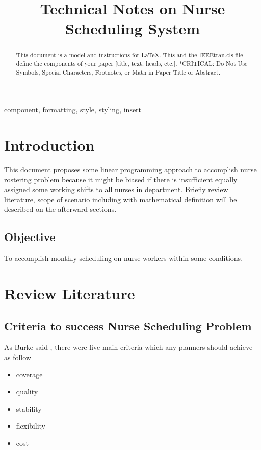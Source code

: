 \documentclass[conference]{IEEEtran}
\begin{document}
\title{Technical Notes on Nurse Scheduling System}

\author{
}

\maketitle

\begin{abstract}
This document is a model and instructions for \LaTeX.
This and the IEEEtran.cls file define the components of your paper [title, text, heads, etc.]. *CRITICAL: Do Not Use Symbols, Special Characters, Footnotes, 
or Math in Paper Title or Abstract.
\end{abstract}

\begin{IEEEkeywords}
component, formatting, style, styling, insert
\end{IEEEkeywords}

\section{Introduction}
This document proposes some linear programming approach to accomplish nurse rostering problem because it might be biased if there is insufficient equally assigned some working shifts to all nurses in department. Briefly review literature, scope of scenario including with mathematical definition will be described on the afterward sections.

\subsection{Objective}
To accomplish monthly scheduling on nurse workers within some conditions.

\section{Review Literature}

\subsection{Criteria to success Nurse Scheduling Problem}

As Burke said \cite{Burke2004}, there were five main criteria which any planners should achieve as follow
\begin{itemize}
	\item coverage
	\item quality
	\item stability
	\item flexibility
	\item cost
\end{itemize}
\end{document}
